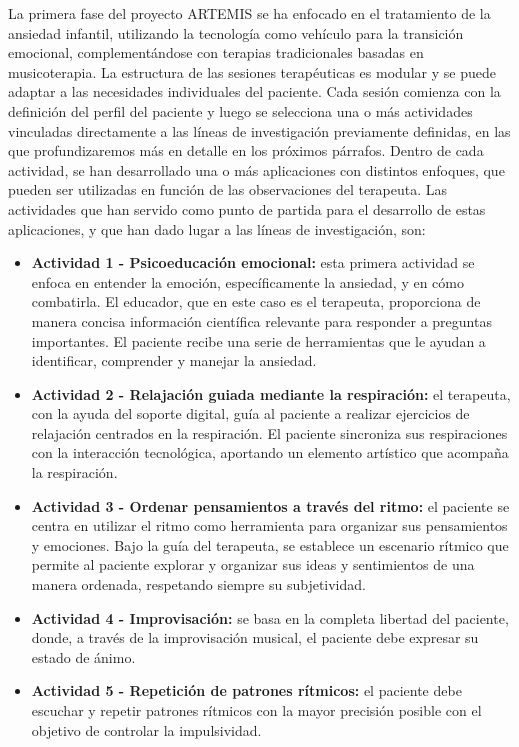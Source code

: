 La primera fase del proyecto ARTEMIS se ha enfocado en el tratamiento de la ansiedad infantil, utilizando la tecnología como vehículo para la transición emocional, complementándose con terapias tradicionales basadas en musicoterapia. La estructura de las sesiones terapéuticas es modular y se puede adaptar a las necesidades individuales del paciente. Cada sesión comienza con la definición del perfil del paciente y luego se selecciona una o más actividades vinculadas directamente a las líneas de investigación previamente definidas, en las que profundizaremos más en detalle en los próximos párrafos. Dentro de cada actividad, se han desarrollado una o más aplicaciones con distintos enfoques, que pueden ser utilizadas en función de las observaciones del terapeuta. Las actividades que han servido como punto de partida para el desarrollo de estas aplicaciones, y que han dado lugar a las líneas de investigación, son:

\begin{itemize}
	\item \textbf{Actividad 1 - Psicoeducación emocional:} esta primera actividad se enfoca en entender la emoción, específicamente la ansiedad, y en cómo combatirla. El educador, que en este caso es el terapeuta, proporciona de manera concisa información científica relevante para responder a preguntas importantes. El paciente recibe una serie de herramientas que le ayudan a identificar, comprender y manejar la ansiedad.
	\item \textbf{Actividad 2 - Relajación guiada mediante la respiración:} el terapeuta, con la ayuda del soporte digital, guía al paciente a realizar ejercicios de relajación centrados en la respiración. El paciente sincroniza sus respiraciones con la interacción tecnológica, aportando un elemento artístico que acompaña la respiración.
	\item \textbf{Actividad 3 - Ordenar pensamientos a través del ritmo:} el paciente se centra en utilizar el ritmo como herramienta para organizar sus pensamientos y emociones. Bajo la guía del terapeuta, se establece un escenario rítmico que permite al paciente explorar y organizar sus ideas y sentimientos de una manera ordenada, respetando siempre su subjetividad.
	\item \textbf{Actividad 4 - Improvisación:} se basa en la completa libertad del paciente, donde, a través de la improvisación musical, el paciente debe expresar su estado de ánimo.
	\item \textbf{Actividad 5 - Repetición de patrones rítmicos:} el paciente debe escuchar y repetir patrones rítmicos con la mayor precisión posible con el objetivo de controlar la impulsividad. 
\end{itemize}

